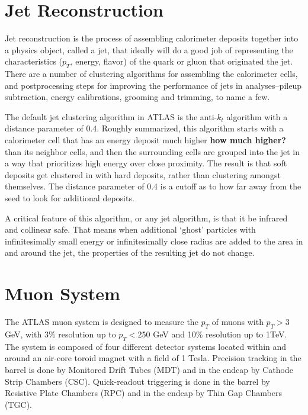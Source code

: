 \documentclass[11pt]{article}
\begin{document}
\section{Jet Reconstruction}
Jet reconstruction is the process of assembling calorimeter deposits together into a physics object, called a jet, that ideally will do a good job of representing the characteristics ($p_T$, energy, flavor) of the quark or gluon that originated the jet.  There are a number of clustering algorithms for assembling the calorimeter cells, and postprocessing steps for improving the performance of jets in analyses--pileup subtraction, energy calibrations, grooming and trimming, to name a few.  

The default jet clustering algorithm in ATLAS is the anti-$k_t$ algorithm with a distance parameter of 0.4.  Roughly summarized, this algorithm starts with a calorimeter cell that has an energy deposit much higher \textbf{how much higher?} than its neighbor cells, and then the surrounding cells are grouped into the jet in a way that prioritizes high energy over close proximity.  The result is that soft deposits get clustered in with hard deposits, rather than clustering amongst themselves.  The distance parameter of 0.4 is a cutoff as to how far away from the seed to look for additional deposits.  

A critical feature of this algorithm, or any jet algorithm, is that it be infrared and collinear safe.  That means when additional `ghost' particles with infinitesimally small energy or infinitesimally close radius are added to the area in and around the jet, the properties of the resulting jet do not change.  



\section{Muon System}
The ATLAS muon system is designed to measure the $p_T$ of muons with $p_T>$3 GeV, with 3\% resolution up to $p_T<$250 GeV and 10\% resolution up to 1TeV.  The system is composed of four different detector systems located within and around an air-core toroid magnet with a field of 1 Tesla.  Precision tracking in the barrel is done by Monitored Drift Tubes (MDT) and in the endcap by Cathode Strip Chambers (CSC).  Quick-readout triggering is done in the barrel by Resistive Plate Chambers (RPC) and in the endcap by Thin Gap Chambers (TGC).  
\end{document}
